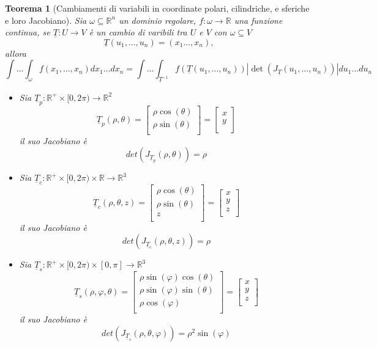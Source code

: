 \documentclass[12pt, a4paper]{article}
\theoremstyle{break}
\newtheorem{theorem}{Teorema} %
\begin{document}
\newpage
\begin{theorem} [Cambiamenti di variabili in coordinate polari, cilindriche, e
	sferiche e loro Jacobiano]
	Sia $\omega \subseteq \mathbb{R}^n$ un dominio regolare, $f: \omega
		\to \mathbb{R}$ una funzione continua, se $\underline{T} : U \to
		V$ è un cambio di varibili tra $U$ e $V$ con $\omega \subseteq V$
	\[
		\underline{T}(u_1, \dots, u_n) = (x_1 \dots, x_n),
	\]
	allora
	\[
		\int \dots \int_{\omega} f(x_1, \dots, x_n) dx_1 \dots dx_n
		= \int \dots \int_{\underline{T}^{-1}} f(\underline{T}(u_1, \dots, u_n))
		| \det(J_{\underline{T}}(u_1, \dots, u_n)) | du_1 \dots du_n
	\]
	\begin{itemize}
		\item Sia $\underline{T}_p : \mathbb{R}^+ \times [0,2\pi) \to
				\mathbb{R}^2$
			\[
				\underline{T}_p(\rho, \theta) =
				\begin{bmatrix}
					\rho \cos(\theta) \\
					\rho \sin(\theta) \\
				\end{bmatrix}
				=
				\begin{bmatrix}
					x \\
					y \\
				\end{bmatrix}
			\]
			il suo Jacobiano è
			\[
				det(J_{\underline{T}_p} (\rho, \theta)) = \rho
			\]
		\item Sia $\underline{T}_c : \mathbb{R}^+ \times
				[0,2\pi) \times \mathbb{R} \to \mathbb{R}^3$
			\[
				\underline{T}_c (\rho, \theta, z) =
				\begin{bmatrix}
					\rho \cos(\theta) \\
					\rho \sin(\theta) \\
					z                 \\
				\end{bmatrix}
				=
				\begin{bmatrix}
					x \\
					y \\
					z \\
				\end{bmatrix}
			\]
			il suo Jacobiano è
			\[
				det(J_{\underline{T}_c} (\rho, \theta, z)) = \rho
			\]
		\item Sia $\underline{T}_s : \mathbb{R}^+ \times
				[0,2\pi) \times [0,\pi] \to \mathbb{R}^3$
			\[
				\underline{T}_s(\rho, \varphi, \theta) =
				\begin{bmatrix}
					\rho \sin(\varphi) \cos(\theta) \\
					\rho \sin(\varphi) \sin(\theta) \\
					\rho \cos(\varphi)              \\
				\end{bmatrix}
				=
				\begin{bmatrix}
					x \\
					y \\
					z \\
				\end{bmatrix}
			\]
			il suo Jacobiano è
			\[
				det(J_{\underline{T}_s} (\rho, \theta, \varphi)) = \rho^2
				\sin(\varphi)
			\]
	\end{itemize}
\end{theorem}
\end{document}
